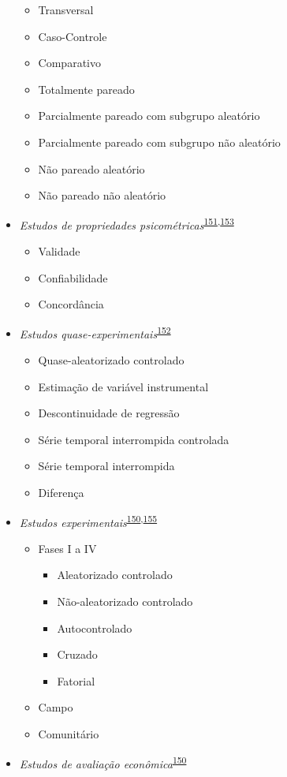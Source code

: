 \documentclass[
  a4paper,
]{book}
\begin{document}
\begin{itemize}
  \begin{itemize}
  \item
    Transversal
  \item
    Caso-Controle
  \item
    Comparativo
  \item
    Totalmente pareado
  \item
    Parcialmente pareado com subgrupo aleatório
  \item
    Parcialmente pareado com subgrupo não aleatório
  \item
    Não pareado aleatório
  \item
    Não pareado não aleatório
  \end{itemize}
\item
  \emph{Estudos de propriedades psicométricas}\textsuperscript{\protect\hyperlink{ref-Souza2017}{151},\protect\hyperlink{ref-echevarruxeda-guanilo2019}{153}}

  \begin{itemize}
  \item
    Validade
  \item
    Confiabilidade
  \item
    Concordância
  \end{itemize}
\item
  \emph{Estudos quase-experimentais}\textsuperscript{\protect\hyperlink{ref-reeves2017}{152}}

  \begin{itemize}
  \item
    Quase-aleatorizado controlado
  \item
    Estimação de variável instrumental
  \item
    Descontinuidade de regressão
  \item
    Série temporal interrompida controlada
  \item
    Série temporal interrompida
  \item
    Diferença
  \end{itemize}
\item
  \emph{Estudos experimentais}\textsuperscript{\protect\hyperlink{ref-Suxfct2014}{150},\protect\hyperlink{ref-Chidambaram2019}{155}}

  \begin{itemize}
  \item
    Fases I a IV

    \begin{itemize}
    \item
      Aleatorizado controlado
    \item
      Não-aleatorizado controlado
    \item
      Autocontrolado
    \item
      Cruzado
    \item
      Fatorial
    \end{itemize}
  \item
    Campo
  \item
    Comunitário
  \end{itemize}
\item
  \emph{Estudos de avaliação econômica}\textsuperscript{\protect\hyperlink{ref-Suxfct2014}{150}}


\end{itemize}
\end{document}

